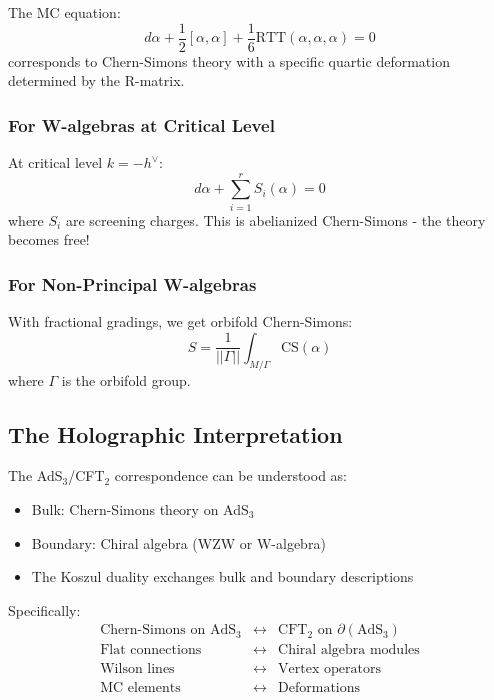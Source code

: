 The MC equation:
\[
d\alpha + \frac{1}{2}[\alpha, \alpha] + \frac{1}{6}\text{RTT}(\alpha, \alpha, \alpha) = 0
\]
corresponds to Chern-Simons theory with a specific quartic deformation determined by the R-matrix.

\subsubsection{For W-algebras at Critical Level}

At critical level $k = -h^\vee$:
\[
d\alpha + \sum_{i=1}^r S_i(\alpha) = 0
\]
where $S_i$ are screening charges. This is abelianized Chern-Simons - the theory becomes free!

\subsubsection{For Non-Principal W-algebras}

With fractional gradings, we get orbifold Chern-Simons:
\[
S = \frac{1}{||\Gamma||} \int_{M/\Gamma} \text{CS}(\alpha)
\]
where $\Gamma$ is the orbifold group.

\subsection{The Holographic Interpretation}

\begin{theorem}
The AdS$_3$/CFT$_2$ correspondence can be understood as:
\begin{itemize}
\item Bulk: Chern-Simons theory on AdS$_3$
\item Boundary: Chiral algebra (WZW or W-algebra)
\item The Koszul duality exchanges bulk and boundary descriptions
\end{itemize}
\end{theorem}

Specifically:
\[
\begin{array}{ccc}
\text{Chern-Simons on AdS}_3 & \longleftrightarrow & \text{CFT}_2 \text{ on } \partial(\text{AdS}_3) \\
\text{Flat connections} & \longleftrightarrow & \text{Chiral algebra modules} \\
\text{Wilson lines} & \longleftrightarrow & \text{Vertex operators} \\
\text{MC elements} & \longleftrightarrow & \text{Deformations}
\end{array}
\]

